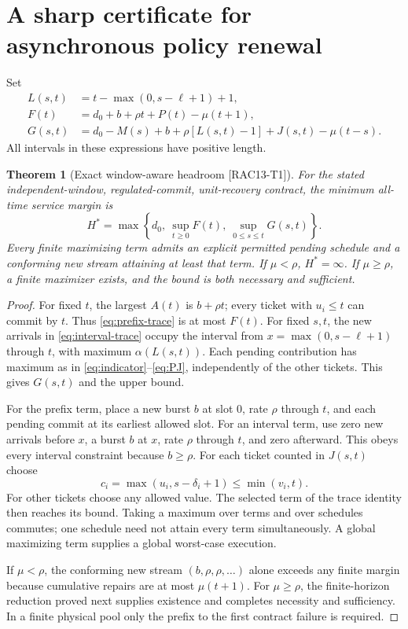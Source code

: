 \documentclass[11pt,a4paper]{article}
\newtheorem{theorem}{Theorem}\newtheorem{proposition}[theorem]{Proposition}
\theoremstyle{definition}\newtheorem{definition}{Definition}
\newcommand{\idtag}[1]{\textnormal{\textsf{[#1]}}}
\begin{document}
\section{A sharp certificate for asynchronous policy renewal}
\label{sec:main}
Set
\begin{align}
L(s,t)&=t-\max(0,s-\ell+1)+1,\\
F(t)&=d_0+b+\rho t+P(t)-\mu(t+1),\\
G(s,t)&=d_0-M(s)+b+\rho[L(s,t)-1]+J(s,t)-\mu(t-s).
\label{eq:terms}
\end{align}
All intervals in these expressions have positive length.

\begin{theorem}[Exact window-aware headroom \idtag{RAC13-T1}]
\label{thm:exact}
For the stated independent-window, regulated-commit, unit-recovery contract, the minimum all-time service margin is
\begin{equation}
\boxed{H^*=\max\left\{d_0,\ \sup_{t\ge0}F(t),\
\sup_{0\le s\le t}G(s,t)\right\}.}
\label{eq:exact}
\end{equation}
Every finite maximizing term admits an explicit permitted pending schedule and a conforming new stream attaining at least that term. If $\mu<\rho$, $H^*=\infty$. If $\mu\ge\rho$, a finite maximizer exists, and the bound is both necessary and sufficient.
\end{theorem}
\begin{proof}
For fixed $t$, the largest $A(t)$ is $b+\rho t$; every ticket with $u_i\le t$ can commit by $t$. Thus \cref{eq:prefix-trace} is at most $F(t)$. For fixed $s,t$, the new arrivals in \cref{eq:interval-trace} occupy the interval from $x=\max(0,s-\ell+1)$ through $t$, with maximum $\alpha(L(s,t))$. Each pending contribution has maximum as in \cref{eq:indicator}--\cref{eq:PJ}, independently of the other tickets. This gives $G(s,t)$ and the upper bound.

For the prefix term, place a new burst $b$ at slot 0, rate $\rho$ through $t$, and each pending commit at its earliest allowed slot. For an interval term, use zero new arrivals before $x$, a burst $b$ at $x$, rate $\rho$ through $t$, and zero afterward. This obeys every interval constraint because $b\ge\rho$. For each ticket counted in $J(s,t)$ choose
\[
c_i=\max(u_i,s-\delta_i+1)\le\min(v_i,t).
\]
For other tickets choose any allowed value. The selected term of the trace identity then reaches its bound. Taking a maximum over terms and over schedules commutes; one schedule need not attain every term simultaneously. A global maximizing term supplies a global worst-case execution.

If $\mu<\rho$, the conforming new stream $(b,\rho,\rho,\ldots)$ alone exceeds any finite margin because cumulative repairs are at most $\mu(t+1)$. For $\mu\ge\rho$, the finite-horizon reduction proved next supplies existence and completes necessity and sufficiency. In a finite physical pool only the prefix to the first contract failure is required.
\end{proof}
\end{document}
